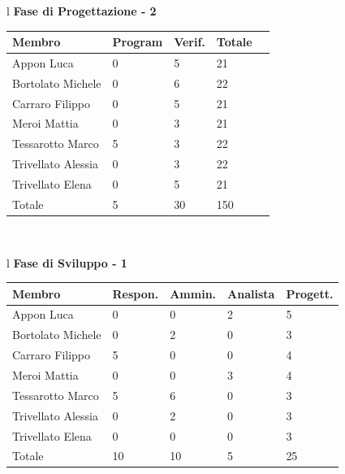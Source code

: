 \documentclass[11pt,titlepage,a4paper]{report}
\begin{document}
\begin{table}[hbtp]
\large{
\begin{tabular}{l}
\Large{\textbf{\textsf{Fase di Progettazione - 2}}} \\
\begin{tabular}{||p{3.5cm}||p{2cm}||p{2cm}||p{2cm}||p{2cm}||}
\hline
\textbf{Membro} & \textbf{Program} & \textbf{Verif.} & \textbf{Totale}\\
\hline
{Appon Luca}&0&5&21 \\ 
\hline 
{Bortolato Michele} &0&6&22\\ 
\hline
{Carraro Filippo}&0&5&21 \\
\hline
{Meroi Mattia}&0&3&21\\
\hline
{Tessarotto Marco} &5&3&22\\
\hline
{Trivellato Alessia} &0&3&22 \\
\hline
{Trivellato Elena} &0&5&21 \\
\hline
{Totale}& 5&30&150 \\
\hline
\end{tabular} \\
\end{tabular}
}
\end{table}


\begin{table}[hbtp]
\large{
\begin{tabular}{l}
\Large{\textbf{\textsf{Fase di Sviluppo - 1}}} \\
\begin{tabular}{||p{3.5cm}||p{2cm}||p{2cm}||p{2cm}||p{2cm}||}
\hline
\textbf{Membro} & \textbf{Respon.} & \textbf{Ammin.} & \textbf{Analista}
& \textbf{Progett.}\\
\hline
{Appon Luca}&0&0&2&5 \\ 
\hline 
{Bortolato Michele} &0&2&0&3\\ 
\hline
{Carraro Filippo}&5&0&0&4 \\
\hline
{Meroi Mattia}&0&0&3&4\\
\hline
{Tessarotto Marco} &5&6&0&3\\
\hline
{Trivellato Alessia} &0&2&0&3 \\
\hline
{Trivellato Elena} &0&0&0&3 \\
\hline
{Totale}& 10&10&5&25 \\
\hline
\end{tabular} \\
\end{tabular}
}
\end{table}
\end{document}
